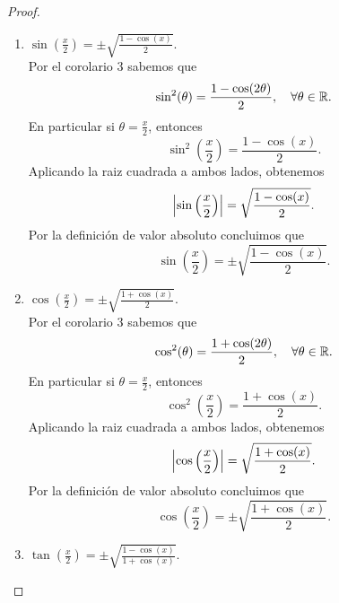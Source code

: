 \documentclass[12pt,a4paper]{article}
\newcommand{\paren}[1]{\left( #1 \right)}
\begin{document}
    \begin{proof}
        \begin{enumerate}
            \item[(a)] $\sin(\frac{x}{2})=\pm\sqrt{\frac{1-\cos(x)}{2}}$.\\
            Por el corolario 3 sabemos que
            \begin{equation*}
                \sin^{2}(\theta)=\frac{1-\cos(2\theta)}{2},\quad\forall\theta\in\mathbb{R}.
            \end{equation*}
            En particular si $\theta=\frac{x}{2}$, entonces
            \begin{equation*}
                \sin^{2}\paren{\frac{x}{2}}=\frac{1-\cos(x)}{2}.
            \end{equation*}
            Aplicando la raiz cuadrada a ambos lados, obtenemos
            \begin{equation*}
                \abs{\sin\paren{\frac{x}{2}}}=\sqrt{\frac{1-\cos(x)}{2}}.
            \end{equation*}
            Por la definición de valor absoluto concluimos que
            \begin{equation*}
                \sin(\frac{x}{2})=\pm\sqrt{\frac{1-\cos(x)}{2}}.
            \end{equation*}
            \item[(b)] $\cos(\frac{x}{2})=\pm\sqrt{\frac{1+\cos(x)}{2}}$.\\
            Por el corolario 3 sabemos que
            \begin{equation*}
                \cos^{2}(\theta)=\frac{1+\cos(2\theta)}{2},\quad\forall\theta\in\mathbb{R}.
            \end{equation*}
            En particular si $\theta=\frac{x}{2}$, entonces
            \begin{equation*}
                \cos^{2}\paren{\frac{x}{2}}=\frac{1+\cos(x)}{2}.
            \end{equation*}
            Aplicando la raiz cuadrada a ambos lados, obtenemos
            \begin{equation*}
                \abs{\cos\paren{\frac{x}{2}}}=\sqrt{\frac{1+\cos(x)}{2}}.
            \end{equation*}
            Por la definición de valor absoluto concluimos que
            \begin{equation*}
                \cos(\frac{x}{2})=\pm\sqrt{\frac{1+\cos(x)}{2}}.
            \end{equation*}
            \item[(c)] $\tan(\frac{x}{2})=\pm\sqrt{\frac{1-\cos(x)}{1+\cos(x)}}$.\\

\end{enumerate}
\end{proof}
\end{document}
